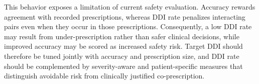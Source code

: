 \documentclass[manuscript,review]{acmart}
\begin{document}
This behavior exposes a limitation of current safety evaluation. Accuracy rewards agreement with recorded prescriptions, whereas DDI rate penalizes interacting pairs even when they occur in those prescriptions. Consequently, a low DDI rate may result from under-prescription rather than safer clinical decisions, while improved accuracy may be scored as increased safety risk. Target DDI should therefore be tuned jointly with accuracy and prescription size, and DDI rate should be complemented by severity-aware and patient-specific measures that distinguish avoidable risk from clinically justified co-prescription.



\end{document}
